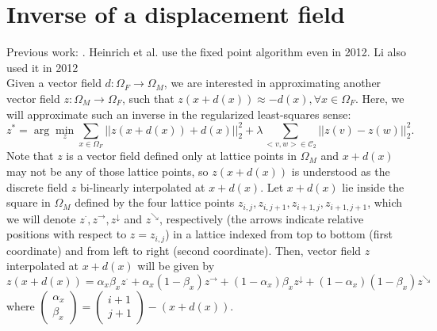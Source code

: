 \documentclass[11pt]{article}
\begin{document}
\section{Inverse of a displacement field}
Previous work: \cite{Crum2007}\cite{Chen2008}\cite{Yan2010}. Heinrich et al. \cite{Heinrich2012} \cite{Heinrich2012a} use the fixed point algorithm even in 2012. Li also used it in 2012 \cite{Li2012}\\
Given a vector field $d:\Omega_{F} \rightarrow \Omega_{M}$, we are interested in approximating another vector field $z:\Omega_{M} \rightarrow \Omega_{F}$, such that $z(x+d(x)) \approx -d(x), \forall x\in \Omega_{F}$. Here, we will approximate such an inverse in the regularized least-squares sense:
\begin{equation}\label{eq_inv_ls}
	z^{*} = \arg\min_{z}\sum_{x\in \Omega_{F}}||z(x+d(x)) + d(x)||_{2}^{2} + \lambda\sum_{<v,w>\in \mathcal{C}_{2}}||z(v)-z(w)||_{2}^{2}.
\end{equation}
Note that $z$ is a vector field defined only at lattice points in $\Omega_{M}$ and $x+d(x)$ may not be any of those lattice points, so $z(x+d(x))$ is understood as the discrete field $z$ bi-linearly interpolated at $x+d(x)$. Let $x+d(x)$ lie inside the square in $\Omega_{M}$ defined by the four lattice points $z_{i,j}, z_{i,j+1}, z_{i+1,j}, z_{i+1,j+1}$, which we will denote $z^{\cdot}, z^{\rightarrow}, z^{\downarrow}$ and $z^{\searrow}$, respectively (the arrows indicate relative positions with respect to $z=z_{i,j}$) in a lattice indexed from top to bottom (first coordinate) and from left to right (second coordinate). Then, vector field $z$ interpolated at $x+d(x)$ will be given by
\begin{equation}
	z(x+d(x))=\alpha_{x}\beta_{x}z^{\cdot} + \alpha_{x}(1-\beta_{x})z^{\rightarrow} + (1-\alpha_{x})\beta_{x}z^{\downarrow} + (1-\alpha_{x})(1-\beta_{x})z^{\searrow}
\end{equation}
where $\left(\begin{array}{c}\alpha_{x} \\ \beta_{x}\end{array}\right) = \left(\begin{array}{c}i+1 \\ j+1\end{array}\right) - (x+d(x))$.\\
\end{document}
